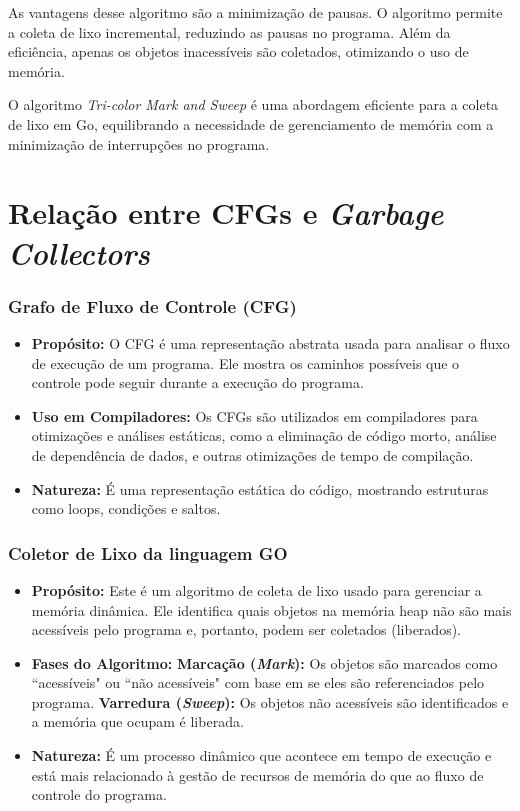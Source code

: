 \documentclass{article}
\begin{document}
    As vantagens desse algoritmo são a minimização de pausas. O algoritmo permite a coleta de lixo incremental, reduzindo as pausas no programa.
    Além da eficiência, apenas os objetos inacessíveis são coletados, otimizando o uso de memória.

    O algoritmo \textit{Tri-color Mark and Sweep} é uma abordagem eficiente para a coleta de lixo em Go,
    equilibrando a necessidade de gerenciamento de memória com a minimização de interrupções no programa.

    \section*{Relação entre CFGs e \emph{Garbage Collectors}}

    \subsubsection*{Grafo de Fluxo de Controle (CFG)}

    \begin{itemize}
        \item \textbf{Propósito:} O CFG é uma representação abstrata usada para analisar o fluxo de execução de um programa.
        Ele mostra os caminhos possíveis que o controle pode seguir durante a execução do programa.

        \item \textbf{Uso em Compiladores:} Os CFGs são utilizados em compiladores para otimizações e análises estáticas,
        como a eliminação de código morto, análise de dependência de dados, e outras otimizações de tempo de compilação.

        \item \textbf{Natureza:} É uma representação estática do código, mostrando estruturas como loops, condições e saltos.
    \end{itemize}

    \subsubsection*{Coletor de Lixo da linguagem GO}

    \begin{itemize}
        \item \textbf{Propósito:} Este é um algoritmo de coleta de lixo usado para gerenciar a memória dinâmica.
        Ele identifica quais objetos na memória heap não são mais acessíveis pelo programa e,
        portanto, podem ser coletados (liberados).
        \item \textbf{Fases do Algoritmo:}
            \subitem \textbf{Marcação (\emph{Mark}):} Os objetos são marcados como ``acessíveis" ou ``não acessíveis"
            com base em se eles são referenciados pelo programa.
            \subitem \textbf{Varredura (\emph{Sweep}):} Os objetos não acessíveis são identificados e a memória que ocupam é liberada.
        \item \textbf{Natureza:}  É um processo dinâmico que acontece em tempo de execução e está mais
        relacionado à gestão de recursos de memória do que ao fluxo de controle do programa.

    \end{itemize}
\end{document}
